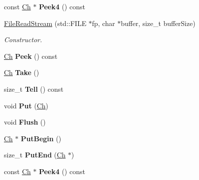 \begin{DoxyCompactItemize}
const \hyperlink{classFileReadStream_ae1f83d9ca3c76d1d151af0b6c427f046}{Ch} $\ast$ {\bfseries Peek4} () const
\item 
\hyperlink{classFileReadStream_adf91191843d50b900f43cb4f35f16f67}{File\+Read\+Stream} (std\+::\+F\+I\+LE $\ast$fp, char $\ast$buffer, size\+\_\+t buffer\+Size)
\begin{DoxyCompactList}\small\item\em Constructor. \end{DoxyCompactList}\item 
\mbox{\label{classFileReadStream_ab7d47da8952d3fe5856a261ec3c020c9}} 
\hyperlink{classFileReadStream_ae1f83d9ca3c76d1d151af0b6c427f046}{Ch} {\bfseries Peek} () const
\item 
\mbox{\label{classFileReadStream_addcbccc9d86ccbbe6d8e876ba595dbcb}} 
\hyperlink{classFileReadStream_ae1f83d9ca3c76d1d151af0b6c427f046}{Ch} {\bfseries Take} ()
\item 
\mbox{\label{classFileReadStream_ae82cfaafe347286b3af8976548bedf86}} 
size\+\_\+t {\bfseries Tell} () const
\item 
\mbox{\label{classFileReadStream_a4f2eac5b08033b1527bff517be657a36}} 
void {\bfseries Put} (\hyperlink{classFileReadStream_ae1f83d9ca3c76d1d151af0b6c427f046}{Ch})
\item 
\mbox{\label{classFileReadStream_acd031e3f578b23bc2a792ac41e1e95ae}} 
void {\bfseries Flush} ()
\item 
\mbox{\label{classFileReadStream_ac985850ab75f204dc08a01d12a8ef5c6}} 
\hyperlink{classFileReadStream_ae1f83d9ca3c76d1d151af0b6c427f046}{Ch} $\ast$ {\bfseries Put\+Begin} ()
\item 
\mbox{\label{classFileReadStream_a886660c89f698ff913d641d61466108f}} 
size\+\_\+t {\bfseries Put\+End} (\hyperlink{classFileReadStream_ae1f83d9ca3c76d1d151af0b6c427f046}{Ch} $\ast$)
\item 
\mbox{\label{classFileReadStream_a03f0b804c4c96762d0c6ef536337b7f0}} 
const \hyperlink{classFileReadStream_ae1f83d9ca3c76d1d151af0b6c427f046}{Ch} $\ast$ {\bfseries Peek4} () const
\end{DoxyCompactItemize}


